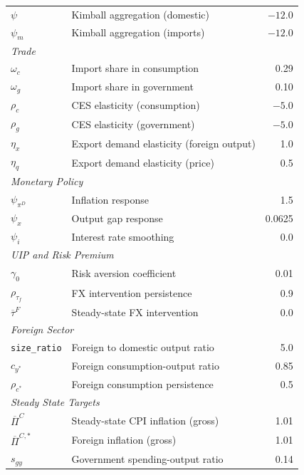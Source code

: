 \documentclass[12pt]{article}
\begin{document}
\begin{table}[H]
\begin{tabular}{llr}
$\psi$ & Kimball aggregation (domestic) & $-12.0$ \\
$\psi_m$ & Kimball aggregation (imports) & $-12.0$ \\
\midrule
\multicolumn{3}{l}{\textit{Trade}} \\
$\omega_c$ & Import share in consumption & 0.29 \\
$\omega_g$ & Import share in government & 0.10 \\
$\rho_c$ & CES elasticity (consumption) & $-5.0$ \\
$\rho_g$ & CES elasticity (government) & $-5.0$ \\
$\eta_x$ & Export demand elasticity (foreign output) & 1.0 \\
$\eta_q$ & Export demand elasticity (price) & 0.5 \\
\midrule
\multicolumn{3}{l}{\textit{Monetary Policy}} \\
$\psi_{\pi^D}$ & Inflation response & 1.5 \\
$\psi_x$ & Output gap response & 0.0625 \\
$\psi_i$ & Interest rate smoothing & 0.0 \\
\midrule
\multicolumn{3}{l}{\textit{UIP and Risk Premium}} \\
$\gamma_0$ & Risk aversion coefficient & 0.01 \\
$\rho_{\tau_f}$ & FX intervention persistence & 0.9 \\
$\overline{\tau}^F$ & Steady-state FX intervention & 0.0 \\
\midrule
\multicolumn{3}{l}{\textit{Foreign Sector}} \\
\texttt{size\_ratio} & Foreign to domestic output ratio & 5.0 \\
$c_{y^*}$ & Foreign consumption-output ratio & 0.85 \\
$\rho_{c^*}$ & Foreign consumption persistence & 0.5 \\
\midrule
\multicolumn{3}{l}{\textit{Steady State Targets}} \\
$\overline{\Pi}^C$ & Steady-state CPI inflation (gross) & 1.01 \\
$\overline{\Pi}^{C,*}$ & Foreign inflation (gross) & 1.01 \\
$s_{gy}$ & Government spending-output ratio & 0.14 \\
\bottomrule
\end{tabular}
\end{table}
\end{document}
